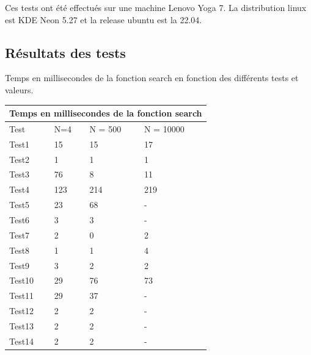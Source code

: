 \documentclass[utf8]{article}
\begin{document}
\begin{large}
    \indent
    \par
    Ces tests ont été effectués sur une machine Lenovo Yoga 7. La distribution
    linux est KDE Neon 5.27 et la release ubuntu est la 22.04.
    \indent

    \subsection{Résultats des tests}
    \indent
    \par
    Temps en millisecondes de la fonction search en fonction des différents tests et valeurs.

    \begin{tabular}{ |p{3cm}||p{3cm}|p{3cm}|p{3cm}|  }
        \hline
        \multicolumn{4}{|c|}{Temps en millisecondes de la fonction search} \\
        \hline
        Test   & N=4 & N = 500 & N = 10000                                 \\
        \hline
        Test1  & 15  & 15      & 17                                        \\
        Test2  & 1   & 1       & 1                                         \\
        Test3  & 76  & 8       & 11                                        \\
        Test4  & 123 & 214     & 219                                       \\
        Test5  & 23  & 68      & -                                         \\
        Test6  & 3   & 3       & -                                         \\
        Test7  & 2   & 0       & 2                                         \\
        Test8  & 1   & 1       & 4                                         \\
        Test9  & 3   & 2       & 2                                         \\
        Test10 & 29  & 76      & 73                                        \\
        Test11 & 29  & 37      & -                                         \\
        Test12 & 2   & 2       & -                                         \\
        Test13 & 2   & 2       & -                                         \\
        Test14 & 2   & 2       & -                                         \\


\end{tabular}
\end{large}
\end{document}

